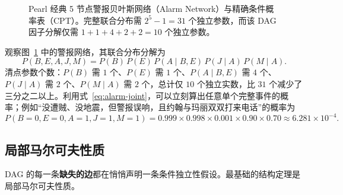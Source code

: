 \begin{figure}[htbp]
\caption{Pearl 经典 5 节点警报贝叶斯网络（Alarm Network）与精确条件概率表（CPT）。完整联合分布需 $2^5 - 1 = 31$ 个独立参数，而该 DAG 因子分解仅需 $1 + 1 + 4 + 2 + 2 = 10$ 个独立参数。}
\label{fig:alarm-bn}
\end{figure}

观察图~\ref{fig:alarm-bn} 中的警报网络，其联合分布分解为
\begin{equation}\label{eq:alarm-joint}
  P(B, E, A, J, M) = P(B)\, P(E)\, P(A \mid B, E)\, P(J \mid A)\, P(M \mid A).
\end{equation}
清点参数个数：$P(B)$ 需 $1$ 个、$P(E)$ 需 $1$ 个、$P(A\mid B,E)$ 需 $4$ 个、$P(J\mid A)$ 需 $2$ 个、$P(M\mid A)$ 需 $2$ 个，总计仅 $10$ 个独立实数，比 $31$ 个减少了三分之二以上。利用式~\eqref{eq:alarm-joint}，可以立刻算出任意单个完整事件的概率；例如“没遭贼、没地震，但警报误响，且约翰与玛丽双双打来电话”的概率为
\[
  P(B=0, E=0, A=1, J=1, M=1) = 0.999 \times 0.998 \times 0.001 \times 0.90 \times 0.70 \approx 6.281 \times 10^{-4}.
\]

\subsection{局部马尔可夫性质}

DAG 的每一条\textbf{缺失的边}都在悄悄声明一条条件独立性假设。最基础的结构定理是局部马尔可夫性质。

